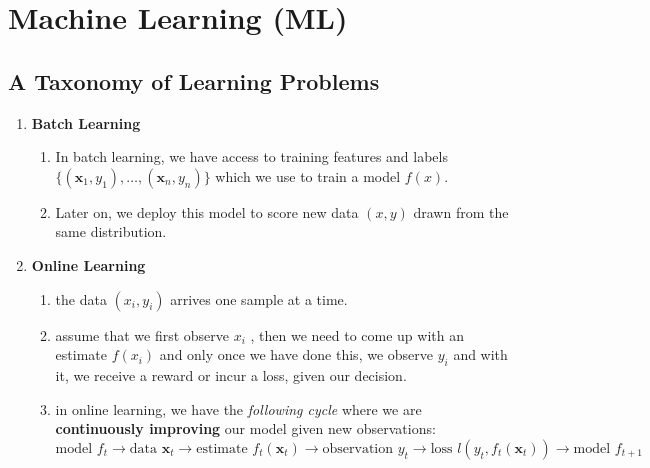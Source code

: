 \chapter{Machine Learning (ML)}

\section{A Taxonomy of Learning Problems \cite{dnn-1}} \label{A Taxonomy of Learning Problems}

\begin{enumerate}[itemsep=0.3cm]
    \item \textbf{Batch Learning}
    \begin{enumerate}
        \item In batch learning, we have access to training features and labels $\{(\mathbf{x}_1, y_1), \ldots, (\mathbf{x}_n, y_n)\}$ which we use to train a model $f(x)$. 
        
        \item Later on, we deploy this model to score new data $(x, y)$ drawn from the same distribution.

    \end{enumerate}

    \item \textbf{Online Learning}
    \begin{enumerate}
        \item the data $(x_i, y_i)$ arrives one sample at a time.

        \item assume that we first observe $x_i$ , then we need to come up with an estimate $f(x_i)$ and only once we have done this, we observe $y_i$ and with it, we receive a reward or incur a loss, given our decision.

        \item in online learning, we have the \textit{following cycle} where we are \textbf{continuously improving} our model given new observations:
        \[
            \textrm{model } f_t 
            \longrightarrow 
            \textrm{data }  \mathbf{x}_t 
            \longrightarrow 
            \textrm{estimate } f_t(\mathbf{x}_t) 
            \longrightarrow
            \textrm{observation } y_t 
            \longrightarrow 
            \textrm{loss } l(y_t, f_t(\mathbf{x}_t)) 
            \longrightarrow 
            \textrm{model } f_{t+1}
        \]

    \end{enumerate}


\end{enumerate}
